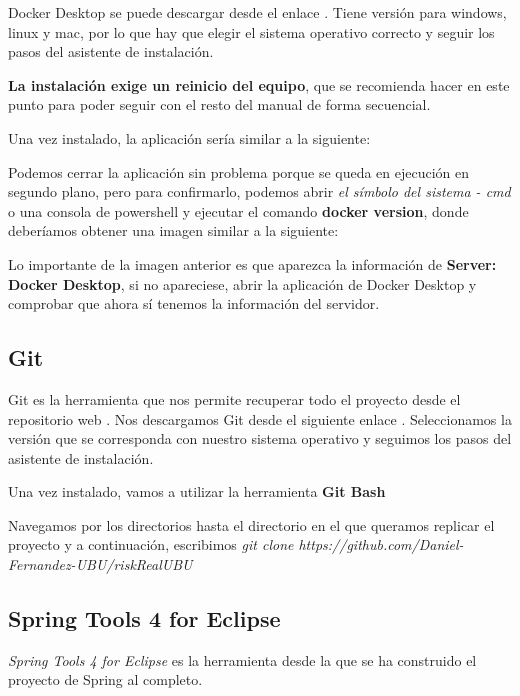 Docker Desktop se puede descargar desde el enlace \cite{web:dockerDesktop}. Tiene versión para windows, linux y mac, por lo que hay que elegir el sistema operativo correcto y seguir los pasos del asistente de instalación.

\textbf{La instalación exige un reinicio del equipo}, que se recomienda hacer en este punto para poder seguir con el resto del manual de forma secuencial.

Una vez instalado, la aplicación sería similar a la siguiente:

Podemos cerrar la aplicación sin problema porque se queda en ejecución en segundo plano, pero para confirmarlo, podemos abrir \textit{el símbolo del sistema - cmd} o una consola de powershell y ejecutar el comando \textbf{docker version}, donde deberíamos obtener una imagen similar a la siguiente:

Lo importante de la imagen anterior es que aparezca la información de \textbf{Server: Docker Desktop}, si no apareciese, abrir la aplicación de Docker Desktop y comprobar que ahora sí tenemos la información del servidor.

\subsection{Git}

Git es la herramienta que nos permite recuperar todo el proyecto desde el repositorio web \cite{github:proyect}. 
Nos descargamos Git desde el siguiente enlace \cite{web:git}.
Seleccionamos la versión que se corresponda con nuestro sistema operativo y seguimos los pasos del asistente de instalación.

Una vez instalado, vamos a utilizar la herramienta \textbf{Git Bash}

Navegamos por los directorios hasta el directorio en el que queramos replicar el proyecto y a continuación, escribimos \textit{git clone https://github.com/Daniel-Fernandez-UBU/riskRealUBU}

\subsection{Spring Tools 4 for Eclipse}

\textit{Spring Tools 4 for Eclipse} es la herramienta desde la que se ha construido el proyecto de Spring al completo. 

